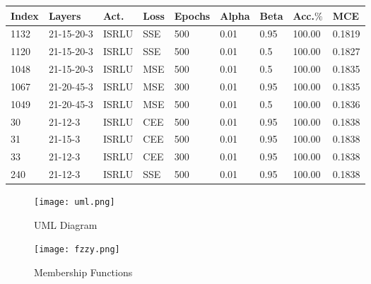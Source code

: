 \begin{table}
    \centering
    \begin{tabular}{|l|l|l|l|l|l|l|l|l|}
    \hline
        Index & Layers & Act. & Loss & Epochs & Alpha & Beta & Acc.\(\%\) & MCE \\ \hline
        1132 & 21-15-20-3 & ISRLU & SSE & 500 & 0.01 & 0.95 & 100.00 & 0.1819 \\ \hline
        1120 & 21-15-20-3 & ISRLU & SSE & 500 & 0.01 & 0.5 & 100.00 & 0.1827 \\ \hline
        1048 & 21-15-20-3 & ISRLU & MSE & 500 & 0.01 & 0.5 & 100.00 & 0.1835 \\ \hline
        1067 & 21-20-45-3 & ISRLU & MSE & 300 & 0.01 & 0.95 & 100.00 & 0.1835 \\ \hline
        1049 & 21-20-45-3 & ISRLU & MSE & 500 & 0.01 & 0.5 & 100.00 & 0.1836 \\ \hline
        30 & 21-12-3 & ISRLU & CEE & 500 & 0.01 & 0.95 & 100.00& 0.1838 \\ \hline
        31 & 21-15-3 & ISRLU & CEE & 500 & 0.01 & 0.95 & 100.00& 0.1838 \\ \hline
        33 & 21-12-3 & ISRLU & CEE & 300 & 0.01 & 0.95 & 100.00& 0.1838 \\ \hline
        240 & 21-12-3 & ISRLU & SSE & 500 & 0.01 & 0.95 & 100.00 & 0.1838 \\ \hline
    \end{tabular}
\end{table}


\begin{figure}
    \centering
    \texttt{[image: uml.png]}
    \caption{UML Diagram}
    \label{fig:uml}
\end{figure}

\begin{figure}
    \centering
    \texttt{[image: fzzy.png]}
    \caption{Membership Functions}
    \label{fig:fuzzy}
\end{figure}